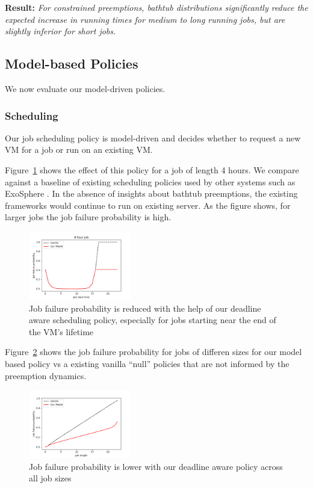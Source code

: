 \noindent \textbf{Result:} \emph{For constrained preemptions, bathtub distributions significantly reduce the expected increase in running times for medium to long running jobs, but are slightly inferior for short jobs.}

\subsection{Model-based Policies}
\label{subsec:eval-policy}

We now evaluate our model-driven policies. 


\subsubsection{Scheduling}

Our job scheduling policy is model-driven and decides whether to request a new VM for a job or run on an existing VM.

Figure~\ref{fig:sched-bathtub} shows the effect of this policy for a job of length 4 hours.
We compare against a baseline of existing scheduling policies used by other systems such as ExoSphere .
In the absence of insights about bathtub preemptions, the existing frameworks would continue to run on existing server.
As the figure shows, for larger jobs the job failure probability is high. 

\begin{figure}[t]
  \includegraphics[width=0.4\textwidth]{../graphs/Sched-bathtub.pdf}
  \caption{Job failure probability is reduced with the help of our deadline aware scheduling policy, especially for jobs starting near the end of the VM's lifetime}
  \label{fig:sched-bathtub}
\end{figure}


Figure~\ref{fig:sched-all} shows the job failure probability for jobs of differen sizes for our model based policy vs a existing vanilla ``null'' policies that are not informed by the preemption dynamics.



\begin{figure}[t]
  \includegraphics[width=0.4\textwidth]{../graphs/Sched-fail-prob.pdf}
  \caption{Job failure probability is lower with our deadline aware policy across all job sizes}
  \label{fig:sched-all}
\end{figure}



